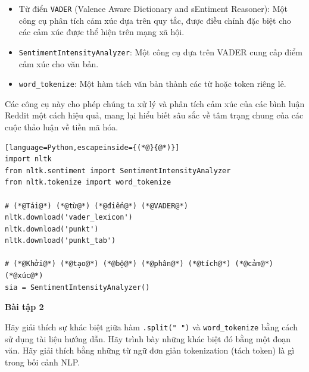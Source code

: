 \begin{itemize}
  \item Từ điển \texttt{VADER} (Valence Aware Dictionary and sEntiment Reasoner): Một công cụ phân tích cảm xúc dựa trên quy tắc, được điều chỉnh đặc biệt cho các cảm xúc được thể hiện trên mạng xã hội.
  \item \texttt{SentimentIntensityAnalyzer}: Một công cụ dựa trên VADER cung cấp điểm cảm xúc cho văn bản.
  \item \texttt{word\_tokenize}: Một hàm tách văn bản thành các từ hoặc token riêng lẻ.
\end{itemize}

Các công cụ này cho phép chúng ta xử lý và phân tích cảm xúc của các bình luận Reddit một cách hiệu quả, mang lại hiểu biết sâu sắc về tâm trạng chung của các cuộc thảo luận về tiền mã hóa.

\begin{lstlisting}[language=Python,escapeinside={(*@}{@*)}]
import nltk
from nltk.sentiment import SentimentIntensityAnalyzer
from nltk.tokenize import word_tokenize

# (*@Tải@*) (*@từ@*) (*@điển@*) (*@VADER@*)
nltk.download('vader_lexicon')
nltk.download('punkt')
nltk.download('punkt_tab')

# (*@Khởi@*) (*@tạo@*) (*@bộ@*) (*@phân@*) (*@tích@*) (*@cảm@*) (*@xúc@*)
sia = SentimentIntensityAnalyzer()
\end{lstlisting}

\textbf{Bài tập 2}

Hãy giải thích sự khác biệt giữa hàm \texttt{.split(" ")} và \texttt{word\_tokenize} bằng cách sử dụng tài liệu hướng dẫn. Hãy trình bày những khác biệt đó bằng một đoạn văn. Hãy giải thích bằng những từ ngữ đơn giản tokenization (tách token) là gì trong bối cảnh NLP.

